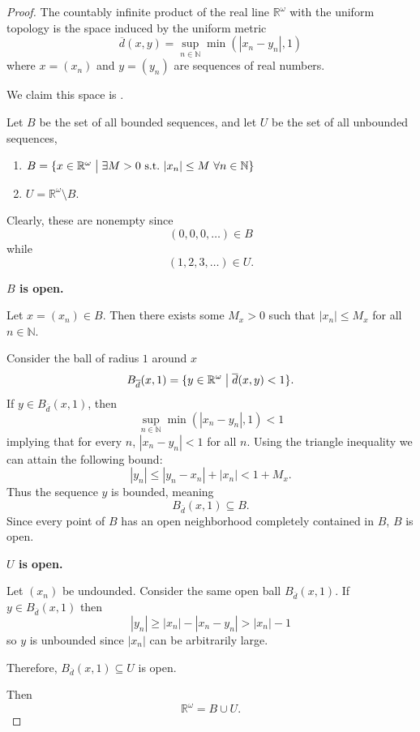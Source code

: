 \documentclass[11pt]{article}
\begin{document}
\begin{proof}
    The countably infinite product 
    of the real line $\mathbb R^\omega$ with 
    the uniform topology is the 
    space induced by the uniform metric 
    \[
        \overline d(x,y) = \sup_{n\in \mathbb N} 
        \min(|x_n-y_n|, 1)
    \]
    where $x = (x_n)$ and $y=(y_n)$ are 
    sequences of real numbers. 

    We claim this space is . 

    Let $B$ be the set of all bounded sequences, 
    and let $U$ be the set of all unbounded sequences, 
    \begin{enumerate}
        \item $B = \{x\in\mathbb R^\omega \bigm| \exists 
        M > 0 \ \text{s.t.} \ |x_n| \leq M \ \forall n \in 
        \mathbb N\}$
        \item $U = \mathbb R^\omega \setminus B$. 
    \end{enumerate}
    Clearly, these are nonempty since 
    \[
        (0,0,0,\ldots) \in B 
    \]
    while 
    \[
        (1,2,3,\ldots) \in U. 
    \]

    \textbf{$B$ is open.}

    Let $x = (x_n) \in B$. Then there exists 
    some $M_x > 0$ such that $|x_n| \leq M_x$ for all 
    $ n \in \mathbb N$. 

    Consider the ball of radius $1$ around $x$ 
    \[
        B_{\overline d}(x,1) = \{y\in \mathbb R^\omega 
        \bigm| \overline d(x,y) < 1\}.  
    \]
    If $y\in B_{\overline d}(x,1)$, then 
    \[
        \sup_{n\in\mathbb N}\min(|x_n-y_n|,1) < 1
    \]
    implying that for every $n$, $|x_n - y_n| < 1$ for 
    all $n$. 
    Using the triangle inequality we can 
    attain the following bound: 
    \[
        |y_n| \leq |y_n - x_n| + |x_n| < 1 + M_x.
    \]
    Thus the sequence $y$ is bounded, meaning 
    \[
        B_{\overline d}(x,1) \subseteq B. 
    \]
    Since every point of $B$ has an open neighborhood 
    completely contained in $B$, $B$ is open. 
    
    \textbf{$U$ is open.}

    Let $(x_n)$ be undounded. 
    Consider the same open ball $B_{\overline d}(x,1)$. 
    If $y\in B_{\overline d}(x,1)$ then 
    \[
        |y_n| \geq |x_n| - |x_n - y_n| > |x_n| - 1
    \]
    so $y$ is unbounded since $|x_n|$ can be arbitrarily 
    large. 

    Therefore, $B_{\overline d}(x,1) \subseteq U$ is open. 

    Then 
    \[
        \mathbb R^\omega = B \cup U. 
    \]
\end{proof}
\end{document}
